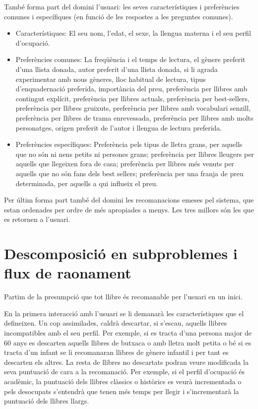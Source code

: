 També forma part del domini l'usuari: les seves característiques i preferències comunes i específiques (en funció de les respostes a les preguntes comunes).
\begin{itemize}
  \item Característiques: El seu nom, l'edat, el sexe, la llengua materna i el seu perfil d'ocupació.
  \item Preferències comunes: La freqüència i el temps de lectura, el gènere preferit d'una llista donada, autor preferit d'una llista donada,  si li agrada experimentar amb nous gèneres, lloc habitual de lectura, tipus d'enquadernació preferida, importància del preu, preferència per llibres amb contingut explícit, preferència per llibres actuals, preferència per best-sellers, preferència per llibres gruixuts, preferència per llibres amb vocabulari senzill, preferència per llibres de trama enrevessada, preferència per llibres amb molts personatges, origen preferit de l'autor i llengua de lectura preferida.
  \item Preferències específiques: Preferència pels tipus de lletra grans, per aquells que no són ni nens petits ni persones grans; preferència per llibres lleugers per aquells que llegeixen fora de casa; preferència per llibres més venuts per aquells que no són fans dels best sellers; preferència per una franja de preu determinada, per aquells a qui influeix el preu.
\end{itemize}

Per últim forma part també del domini les recomanacions emeses pel sistema, que estan ordenades per ordre de més apropiades a menys. Les tres millors són les que es retornen a l'usuari.

\section{Descomposició en subproblemes i flux de raonament}

Partim de la presumpció que tot llibre és recomanable per l'usuari en un inici. 

En la primera interacció amb l'usuari se li demanarà les característiques que el defineixen. Un cop assimilades, caldrà descartar, si s'escau, aquells llibres incompatibles amb el seu perfil. Per exemple, si es tracta d'una persona major de 60 anys es descarten aquells llibres de butxaca o amb lletra molt petita o bé si es tracta d'un infant se li recomanaran llibres de gènere infantil i per tant es descarten els altres. La resta de llibres no descartats podran veure modificada la seva puntuació de cara a la recomanació. Per exemple, si el perfil d'ocupació és acadèmic, la puntuació dels llibres clàssics o històrics es veurà incrementada o pels desocupats s'entendrà que tenen més temps per llegir i s'incrementarà la puntuació dels llibres llargs. 

